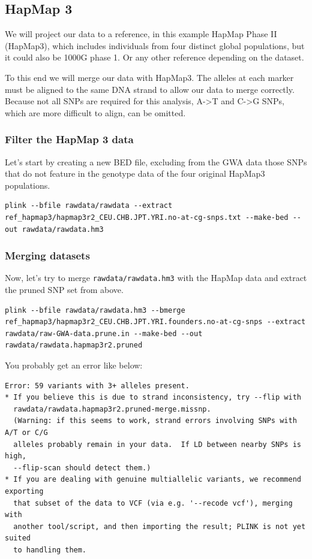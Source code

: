 \documentclass[
]{book}
\begin{document}
\hypertarget{hapmap-3}{%
\subsection{HapMap 3}\label{hapmap-3}}

We will project our data to a reference, in this example HapMap Phase II (HapMap3), which includes individuals from four distinct global populations, but it could also be 1000G phase 1. Or any other reference depending on the dataset.

To this end we will merge our data with HapMap3. The alleles at each marker must be aligned to the same DNA strand to allow our data to merge correctly. Because not all SNPs are required for this analysis, A-\textgreater T and C-\textgreater G SNPs, which are more difficult to align, can be omitted.

\hypertarget{filter-the-hapmap-3-data}{%
\subsubsection{Filter the HapMap 3 data}\label{filter-the-hapmap-3-data}}

Let's start by creating a new BED file, excluding from the GWA data those SNPs that do not feature in the genotype data of the four original HapMap3 populations.

\begin{verbatim}
plink --bfile rawdata/rawdata --extract ref_hapmap3/hapmap3r2_CEU.CHB.JPT.YRI.no-at-cg-snps.txt --make-bed --out rawdata/rawdata.hm3
\end{verbatim}

\hypertarget{merging-datasets}{%
\subsubsection{Merging datasets}\label{merging-datasets}}

Now, let's try to merge \texttt{rawdata/rawdata.hm3} with the HapMap data and extract the pruned SNP set from above.

\begin{verbatim}
plink --bfile rawdata/rawdata.hm3 --bmerge ref_hapmap3/hapmap3r2_CEU.CHB.JPT.YRI.founders.no-at-cg-snps --extract rawdata/raw-GWA-data.prune.in --make-bed --out rawdata/rawdata.hapmap3r2.pruned
\end{verbatim}

You probably get an error like below:

\begin{verbatim}
Error: 59 variants with 3+ alleles present.
* If you believe this is due to strand inconsistency, try --flip with
  rawdata/rawdata.hapmap3r2.pruned-merge.missnp.
  (Warning: if this seems to work, strand errors involving SNPs with A/T or C/G
  alleles probably remain in your data.  If LD between nearby SNPs is high,
  --flip-scan should detect them.)
* If you are dealing with genuine multiallelic variants, we recommend exporting
  that subset of the data to VCF (via e.g. '--recode vcf'), merging with
  another tool/script, and then importing the result; PLINK is not yet suited
  to handling them.
\end{verbatim}
\end{document}
